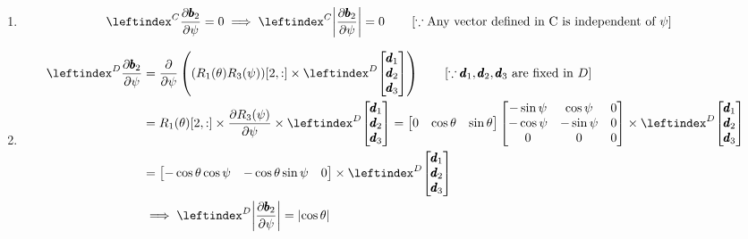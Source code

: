 \begin{enumerate}
 \item
\begin{align*}
    \lx{^C}{\frac {\partial \pmb b_2}  {\partial \psi}} &= 0
    \implies \lx{^C}{\norm{\frac {\partial \pmb b_2}  {\partial \psi}}} = 0
    \qquad \left[ \because \text{Any vector defined in C is independent of } \psi \right]
\end{align*}

 \item
\begin{align*}
    \lx{^D}{\frac {\partial \pmb b_2}  {\partial \psi}} &= \frac{\partial}{\partial \psi} \left((R_1(\theta) R_3(\psi))[2,:] \times \lx{^D}{\bm{\pmb d_1 \\ \pmb d_2 \\ \pmb d_3}} \right)
    \qquad \left[\because \pmb d_1, \pmb d_2, \pmb d_3 \text{ are fixed in } D \right]\\
    &= R_1(\theta)[2,:] \times \frac{\partial R_3(\psi)}{\partial \psi} \times \lx{^D}{\bm{\pmb d_1 \\ \pmb d_2 \\ \pmb d_3}}
    = \bm{0 & \cos \theta & \sin \theta} \bm{-\sin \psi & \cos \psi & 0 \\
                                             -\cos \psi & -\sin \psi & 0\\
                                             0 & 0 & 0}
                        \times \lx{^D}{\bm{\pmb d_1 \\ \pmb d_2 \\ \pmb d_3}}\\
    &= \bm{-\cos \theta \cos \psi & -\cos \theta \sin \psi & 0} \times \lx{^D}{\bm{\pmb d_1 \\ \pmb d_2 \\ \pmb d_3}}\\
    &\implies  \lx{^D}{\norm{\frac {\partial \pmb b_2}  {\partial \psi}}} = \norm{\cos \theta}
\end{align*}


\end{enumerate}
